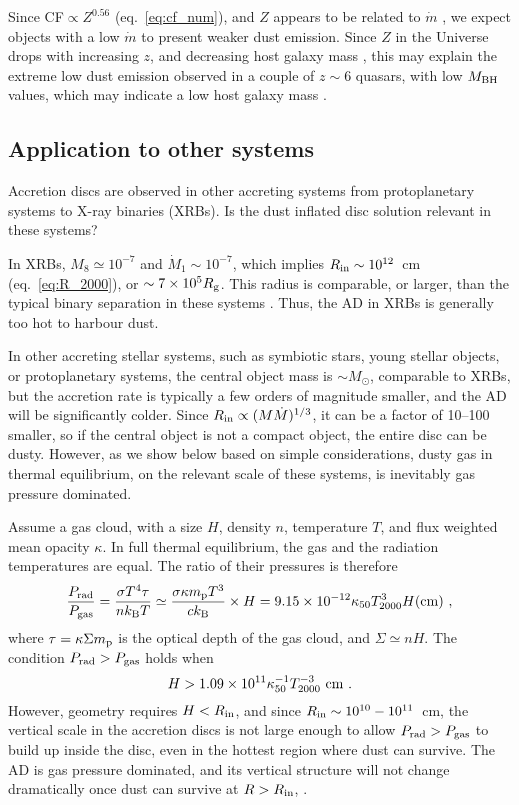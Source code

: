 \documentclass[a4paper,fleqn,usenatbib]{mnras}
\newcommand{\mdot}{\dot{M}}
\begin{document}
Since CF$\propto Z^{0.56}$ (eq.~\ref{eq:cf_num}), and $Z$
appears to be related to $\dot{m}$ \citep{Shemmer04},  we expect objects with a low $\dot{m}$ to 
present weaker dust emission. 
Since $Z$ in the Universe drops with increasing $z$, 
and decreasing host galaxy mass \citep{Mannucci10}, this may explain the extreme low dust emission 
observed in a couple of $z\sim 6$ quasars, with low $M_{\rm BH}$ values, 
which may indicate a low host galaxy mass \citep{Jiang10}.




\subsection{Application to other systems}

Accretion discs are observed in other accreting systems from protoplanetary systems to X-ray binaries (XRBs).
Is the dust inflated disc solution relevant in these systems? 

In XRBs, $M_8\simeq 10^{-7}$ and $\mdot_1\sim 10^{-7}$, which implies 
$R_{\rm in}\sim 10^{12}$~cm (eq.~\ref{eq:R_2000}), or $\sim 7\times 10^5 R_{\rm g}$.
This radius is comparable, or larger, than the typical binary separation in these systems
\citep{Remillard06}. Thus, the AD in XRBs is generally too hot to harbour dust.

In other accreting stellar systems, such as symbiotic stars, young stellar objects, or protoplanetary systems,
the central object mass is $\sim M_{\odot}$, comparable to XRBs, but the accretion rate is typically a few orders of magnitude smaller, and the AD will be significantly colder. Since $R_{\rm in}\propto (M\mdot)^{1/3}$, it can be a factor 
of 10--100 smaller,
so if the central object is not a compact object, the entire disc can be dusty. 
However, as we show below based on simple considerations, dusty gas in thermal equilibrium, on the relevant scale 
of these systems, is inevitably gas pressure dominated.

Assume a gas cloud, with a size $H$, density $n$, temperature $T$, and flux weighted mean opacity $\kappa$. 
In full thermal equilibrium, the gas and the radiation temperatures are equal. The ratio of their pressures 
is therefore
\begin{equation} 
\frac{P_{\rm rad}}{P_{\rm gas}}=\frac{\sigma T^4\tau}{nk_{\rm B}T}
\simeq \frac{\sigma\kappa m_{\rm p} T^3}{c k_{\rm B}}\times H
=9.15\times 10^{-12} \kappa_{50} T_{2000}^3 H({\rm cm})\ ,
\end{equation} 
where $\tau=\kappa\Sigma m_{\rm p}$ is the optical depth of the gas cloud, and $\Sigma\simeq nH$. 
The condition $P_{\rm rad}>P_{\rm gas}$ holds when
\begin{equation} 
H> 1.09\times 10^{11} \kappa_{50}^{-1} T_{2000}^{-3}~{\rm cm}\ .
\end{equation} 
However, geometry requires $H<R_{\rm in}$, and since $R_{\rm in}\sim 10^{10}-10^{11}$~cm, 
the vertical scale in the accretion discs is not large enough to allow 
$P_{\rm rad}>P_{\rm gas}$ to build up inside the disc, even in the hottest region where
dust can survive. The AD is gas pressure dominated, and its vertical structure will not change 
dramatically once dust can survive at $R>R_{\rm in}$, . 
\end{document}
